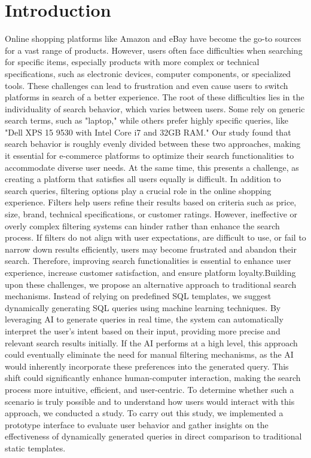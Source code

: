 \documentclass[../../submission.tex]{subfiles}
\begin{document}
\section{Introduction}
Online shopping platforms like Amazon and eBay have become the go-to sources for a vast range of products. 
However, users often face difficulties when searching for specific items, especially products with more complex or technical specifications, 
such as electronic devices, computer components, or specialized tools. These challenges can lead to frustration and even cause users to switch platforms in 
search of a better experience. The root of these difficulties lies in the individuality of search behavior, which varies between users. Some rely on generic 
search terms, such as "laptop," while others prefer highly specific queries, like "Dell XPS 15 9530 with Intel Core i7 and 32GB RAM." Our study found that search 
behavior is roughly evenly divided between these two approaches, making it essential for e-commerce platforms to optimize their search functionalities to 
accommodate diverse user needs. At the same time, this presents a challenge, as creating a platform that satisfies all users equally is difficult.
In addition to search queries, filtering options play a crucial role in the online shopping experience. Filters help users refine their results based on 
criteria such as price, size, brand, technical specifications, or customer ratings. However, ineffective or overly complex filtering systems can hinder rather 
than enhance the search process. If filters do not align with user expectations, are difficult to use, or fail to narrow down results efficiently, users may 
become frustrated and abandon their search. Therefore, improving search functionalities is essential to enhance user experience, increase customer satisfaction, 
and ensure platform loyalty.Building upon these challenges, we propose an alternative approach to traditional search mechanisms. Instead of relying on predefined SQL templates, we suggest 
dynamically generating SQL queries using machine learning techniques. By leveraging AI to generate queries in real time, the system can automatically interpret 
the user’s intent based on their input, providing more precise and relevant search results initially. If the AI performs at a high level, this approach could 
eventually eliminate the need for manual filtering mechanisms, as the AI would inherently incorporate these preferences into the generated query. 
This shift could significantly enhance human-computer interaction, making the search process more intuitive, efficient, and user-centric.
To determine whether such a scenario is truly possible and to understand how users would interact with this approach, we conducted a study. 
To carry out this study, we implemented a prototype interface to evaluate user behavior and gather insights on the effectiveness of dynamically generated 
queries in direct comparison to traditional static templates.
\end{document}
